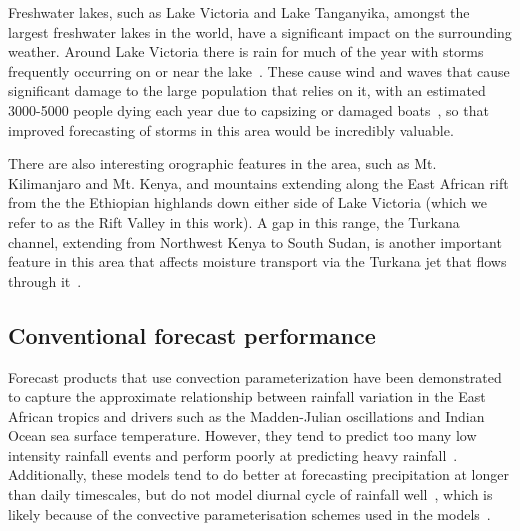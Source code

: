 \documentclass{article}
\begin{document}
Freshwater lakes, such as Lake Victoria and Lake Tanganyika, amongst the largest freshwater lakes in the world, have a significant impact on the surrounding weather. Around Lake Victoria there is rain for much of the year with storms frequently occurring on or near the lake~\citep{macleod_drivers_2021, chamberlain_forecasting_2014, woodhams_identifying_2019}. These cause wind and waves that cause significant damage to the large population that relies on it, with an estimated 3000-5000 people dying each year due to capsizing or damaged boats~\citep{ifrc_world_2014}, so that improved forecasting of storms in this area would be incredibly valuable. 

There are also interesting orographic features in the area, such as Mt. Kilimanjaro and Mt. Kenya, and mountains extending along the East African rift from the the Ethiopian highlands down either side of Lake Victoria (which we refer to as the Rift Valley in this work). A gap in this range, the Turkana channel, extending from Northwest Kenya to South Sudan, is another important feature in this area that affects moisture transport via the Turkana jet that flows through it~\citep{nicholson_turkana_2016}.


\subsection{Conventional forecast performance}


Forecast products that use convection parameterization have been demonstrated to capture the approximate relationship between rainfall variation in the East African tropics and drivers such as the Madden-Julian oscillations and Indian Ocean sea surface temperature. However, they tend to predict too many low intensity rainfall events and perform poorly at predicting heavy rainfall~\citep{woodhams_what_2018, chamberlain_forecasting_2014, vogel_skill_2018, walker_skill_2019, bechtold_representing_2014, haiden_intercomparison_2012}. Additionally, these models tend to do better at forecasting precipitation at longer than daily timescales, but do not model diurnal cycle of rainfall well~\citep{kim_tropical_2013, macleod_drivers_2021, bechtold_simulation_2004}, which is likely because of the convective parameterisation schemes used in the models~\citep{vogel_skill_2018, marsham_role_2013, bechtold_representing_2014}. 
\end{document}
